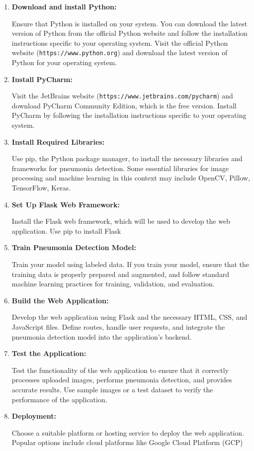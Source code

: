 \begin{enumerate}
	\item \textbf {Download and install Python:}
	
	Ensure that Python is installed on your system. You can download the latest version of Python from the official Python website and follow the installation instructions specific to your operating system. Visit the official Python website (\texttt{https://www.python.org}) and download the latest version of Python for your operating system.
	
	\item \textbf {Install PyCharm:}
	
	 Visit the JetBrains website (\texttt{https://www.jetbrains.com/pycharm}) and download PyCharm Community Edition, which is the free version. Install PyCharm by following the installation instructions specific to your operating system.
	
	\item \textbf {Install Required Libraries:}
	 
	Use pip, the Python package manager, to install the necessary libraries and frameworks for pneumonia detection. Some essential libraries for image processing and machine learning in this context may include OpenCV, Pillow, TensorFlow, Keras.
	
	\item \textbf {Set Up Flask Web Framework:}
	
	 Install the Flask web framework, which will be used to develop the web application. Use pip to install Flask
	 
	 \item \textbf{Train Pneumonia Detection Model:}
	 
	 Train your model using labeled data. If you train your model, ensure that the training data is properly prepared and augmented, and follow standard machine learning practices for training, validation, and evaluation.
	 
	  \item \textbf {Build the Web Application:} 
	  
	  Develop the web application using Flask and the necessary HTML, CSS, and JavaScript files. Define routes, handle user requests, and integrate the pneumonia detection model into the application's backend.
	 
	\item \textbf { Test the Application:}
	
	Test the functionality of the web application to ensure that it correctly processes uploaded images, performs pneumonia detection, and provides accurate results. Use sample images or a test dataset to verify the performance of the application.
	
	\item \textbf {Deployment:}
	
	Choose a suitable platform or hosting service to deploy the web application. Popular options include cloud platforms like Google Cloud Platform (GCP)
	
	
\end{enumerate}

